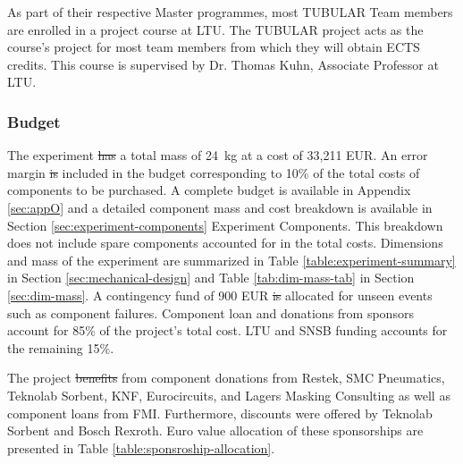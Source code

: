 \documentclass[a4paper,12pt,oneside]{article}
\providecommand{\DIFaddtex}[1]{{\protect\color{blue}\uwave{#1}}} %
\providecommand{\DIFdeltex}[1]{{\protect\color{red}\sout{#1}}}                      %
\providecommand{\DIFaddbegin}{} %
\providecommand{\DIFaddend}{} %
\providecommand{\DIFdelbegin}{} %
\providecommand{\DIFdelend}{} %
\providecommand{\DIFadd}[1]{\texorpdfstring{\DIFaddtex{#1}}{#1}} %
\providecommand{\DIFdel}[1]{\texorpdfstring{\DIFdeltex{#1}}{}} %
\newcommand{\DIFscaledelfig}{0.5}
\newlength{\DIFdelgraphicswidth} %
\newlength{\DIFdelgraphicsheight} %
\newcommand{\DIFaddincludegraphics}[2][]{{\color{blue}\fbox{\DIFOincludegraphics[#1]{#2}}}} %
\newcommand{\DIFdelincludegraphics}[2][]{%
\sbox{\DIFdelgraphicsbox}{\DIFOincludegraphics[#1]{#2}}%
\settoboxwidth{\DIFdelgraphicswidth}{\DIFdelgraphicsbox} %
\settoboxtotalheight{\DIFdelgraphicsheight}{\DIFdelgraphicsbox} %
\scalebox{\DIFscaledelfig}{%
\parbox[b]{\DIFdelgraphicswidth}{\usebox{\DIFdelgraphicsbox}\\[-\baselineskip] \rule{\DIFdelgraphicswidth}{0em}}\llap{\resizebox{\DIFdelgraphicswidth}{\DIFdelgraphicsheight}{%
\setlength{\unitlength}{\DIFdelgraphicswidth}%
\begin{picture}(1,1)%
\thicklines\linethickness{2pt} %
{\color[rgb]{1,0,0}\put(0,0){\framebox(1,1){}}}%
{\color[rgb]{1,0,0}\put(0,0){\line( 1,1){1}}}%
{\color[rgb]{1,0,0}\put(0,1){\line(1,-1){1}}}%
\end{picture}%
}\hspace*{3pt}}} %
} %
\DeclareRobustCommand{\DIFaddbegin}{\DIFOaddbegin \let\includegraphics\DIFaddincludegraphics} %
\DeclareRobustCommand{\DIFaddend}{\DIFOaddend \let\includegraphics\DIFOincludegraphics} %
\DeclareRobustCommand{\DIFdelbegin}{\DIFOdelbegin \let\includegraphics\DIFdelincludegraphics} %
\DeclareRobustCommand{\DIFdelend}{\DIFOaddend \let\includegraphics\DIFOincludegraphics} %
\begin{document}
As part of their respective Master programmes, most TUBULAR Team members are enrolled in a project course at LTU. The TUBULAR project acts as the course's project for most team members from which they will obtain ECTS credits. This course is supervised by Dr. Thomas Kuhn, Associate Professor at LTU.

\pagebreak
\subsubsection{Budget}
\label{sec:3.2.2}
The experiment \DIFdelbegin \DIFdel{has }\DIFdelend \DIFaddbegin \DIFadd{had }\DIFaddend a total mass of \SI{24}{\kilo\gram} at a cost of 33,211 EUR. An error margin \DIFdelbegin \DIFdel{is }\DIFdelend \DIFaddbegin \DIFadd{was }\DIFaddend included in the budget corresponding to 10\% of the total costs of components to be purchased. A complete budget is available in Appendix \ref{sec:appO} and a detailed component mass and cost breakdown is available in Section \ref{sec:experiment-components} Experiment Components. This breakdown does not include spare components accounted for in the total costs. Dimensions and mass of the experiment are summarized in Table \ref{table:experiment-summary} in Section \ref{sec:mechanical-design} and Table \ref{tab:dim-mass-tab} in Section \ref{sec:dim-mass}. A contingency fund of 900 EUR \DIFdelbegin \DIFdel{is }\DIFdelend \DIFaddbegin \DIFadd{was }\DIFaddend allocated for unseen events such as component failures. Component loan and donations from sponsors account for 85\% of the project's total cost. LTU and SNSB funding accounts for the remaining 15\%. 

%

The project \DIFdelbegin \DIFdel{benefits }\DIFdelend \DIFaddbegin \DIFadd{benefited }\DIFaddend from component donations from Restek, SMC Pneumatics, Teknolab Sorbent, KNF, Eurocircuits, and Lagers Masking Consulting as well as component loans from FMI. Furthermore, discounts were offered by Teknolab Sorbent and Bosch Rexroth. Euro value allocation of these sponsorships are presented in Table \ref{table:sponsroship-allocation}.
\end{document}
